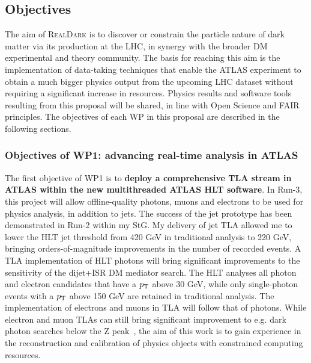 \subsection{Objectives}
\label{sub:objectives}
\smallskip

The aim of \textsc{RealDark} is to discover or constrain the particle nature of dark matter via its production at the LHC, 
in synergy with the broader DM experimental and theory community. 
The basis for reaching this aim is the implementation of data-taking techniques that enable the ATLAS experiment to obtain a much bigger physics output from the upcoming LHC dataset without requiring a significant increase in resources. 
Physics results and software tools resulting from this proposal will be shared, in line with Open Science and FAIR principles.
The objectives of each WP in this proposal are described in the following sections. 


\subsubsection{Objectives of WP1: advancing real-time analysis in ATLAS}

The first objective of WP1 is to \textbf{deploy a comprehensive TLA stream in ATLAS within the new multithreaded ATLAS HLT software}. %
In Run-3, this project will allow offline-quality photons, muons and electrons to be used for physics analysis, in addition to jets. 
The success of the jet prototype has been demonstrated in Run-2 within my StG. 
My delivery of jet TLA allowed me to lower the HLT jet threshold from 420 GeV in traditional analysis to 220 GeV, bringing orders-of-magnitude improvements in the number of recorded events. 
A TLA implementation of HLT photons will bring significant improvements to the sensitivity of the dijet+ISR DM mediator search. 
The HLT analyses all photon and electron candidates that have a $p_{\rm{T}}$ above 30 GeV, 
while only single-photon events with a $p_{\rm{T}}$ above 150 GeV are retained in traditional analysis. 
The implementation of electrons and muons in TLA will follow that of photons.
While electron and muon TLAs can still bring significant improvement to e.g. dark photon searches below the Z peak~\cite{ToBeCited}, %
the aim of this work is to gain experience in the reconstruction and calibration of physics objects with constrained computing resources. 

